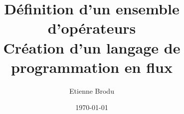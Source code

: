 \documentclass[final,10pt]{article}
\author{Etienne Brodu}
\date{\today}
\title{Définition d'un ensemble d'opérateurs\\
\small{Création d'un langage de programmation en flux}}
\begin{document}
\maketitle
\newpage

\tableofcontents{}
\newpage




% 
% 
\end{document}
